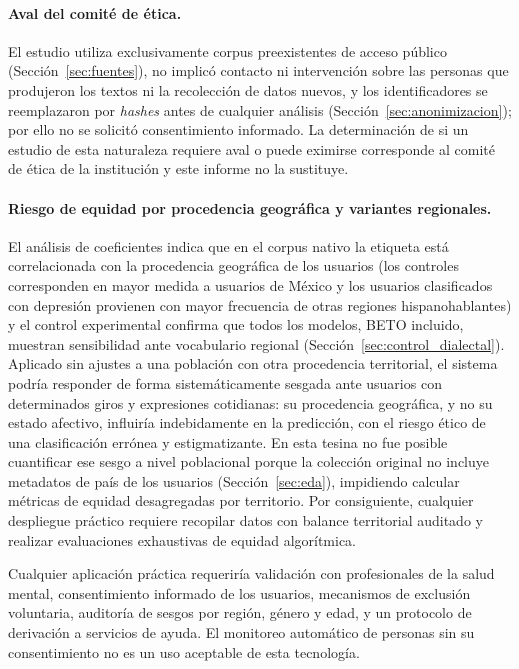 \documentclass[12pt,a4paper]{article}
\begin{document}
\paragraph{Aval del comité de ética.} El estudio utiliza exclusivamente corpus preexistentes de acceso público (Sección~\ref{sec:fuentes}), no implicó contacto ni intervención sobre las personas que produjeron los textos ni la recolección de datos nuevos, y los identificadores se reemplazaron por \emph{hashes} antes de cualquier análisis (Sección~\ref{sec:anonimizacion}); por ello no se solicitó consentimiento informado. La determinación de si un estudio de esta naturaleza requiere aval o puede eximirse corresponde al comité de ética de la institución y este informe no la sustituye.

\paragraph{Riesgo de equidad por procedencia geográfica y variantes regionales.} El análisis de coeficientes indica que en el corpus nativo la etiqueta está correlacionada con la procedencia geográfica de los usuarios (los controles corresponden en mayor medida a usuarios de México y los usuarios clasificados con depresión provienen con mayor frecuencia de otras regiones hispanohablantes) y el control experimental confirma que todos los modelos, BETO incluido, muestran sensibilidad ante vocabulario regional (Sección~\ref{sec:control_dialectal}). Aplicado sin ajustes a una población con otra procedencia territorial, el sistema podría responder de forma sistemáticamente sesgada ante usuarios con determinados giros y expresiones cotidianas: su procedencia geográfica, y no su estado afectivo, influiría indebidamente en la predicción, con el riesgo ético de una clasificación errónea y estigmatizante. En esta tesina no fue posible cuantificar ese sesgo a nivel poblacional porque la colección original no incluye metadatos de país de los usuarios (Sección~\ref{sec:eda}), impidiendo calcular métricas de equidad desagregadas por territorio. Por consiguiente, cualquier despliegue práctico requiere recopilar datos con balance territorial auditado y realizar evaluaciones exhaustivas de equidad algorítmica.

Cualquier aplicación práctica requeriría validación con profesionales de la salud mental, consentimiento informado de los usuarios, mecanismos de exclusión voluntaria, auditoría de sesgos por región, género y edad, y un protocolo de derivación a servicios de ayuda. El monitoreo automático de personas sin su consentimiento no es un uso aceptable de esta tecnología.
\end{document}
